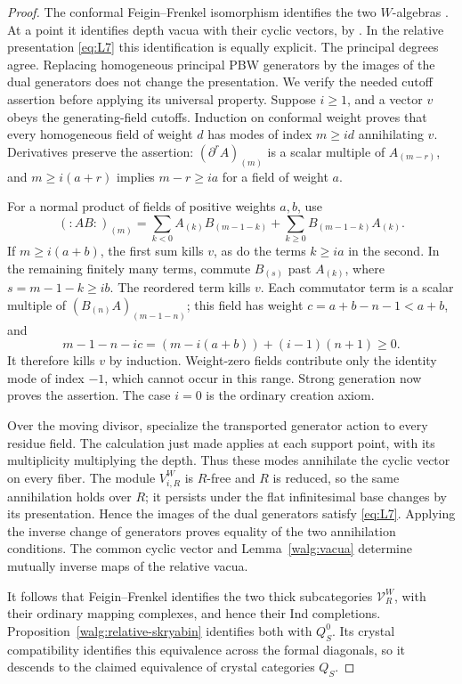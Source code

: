 \documentclass[11pt]{article}
\numberwithin{equation}{section}
\theoremstyle{definition}
\theoremstyle{remark}
\begin{document}
\begin{proof}
The conformal Feigin--Frenkel isomorphism identifies the two
\(W\)-algebras \cite{FeiginFrenkel}.  At a point it identifies depth
vacua with their cyclic vectors, by \cite[Lemma~7.3.3]{RaskinW}.  In the relative
presentation \eqref{eq:L7} this identification is equally explicit.
The principal degrees agree.  Replacing homogeneous principal PBW
generators by the images of the dual generators does not change the
presentation.  We verify the needed cutoff assertion before applying
its universal property.  Suppose \(i\geq1\), and a vector \(v\) obeys
the generating-field cutoffs.  Induction on conformal weight proves
that every homogeneous field of weight \(d\) has modes of index
\(m\geq id\) annihilating \(v\).  Derivatives preserve the assertion:
\((\partial^r A)_{(m)}\) is a scalar multiple of \(A_{(m-r)}\),
and \(m\geq i(a+r)\) implies \(m-r\geq ia\) for a field of
weight \(a\).

For a normal product of fields of positive weights \(a,b\), use
\[
 (:AB:)_{(m)}=
 \sum_{k<0} A_{(k)}B_{(m-1-k)}+
 \sum_{k\geq0}B_{(m-1-k)}A_{(k)}.
\]
If \(m\geq i(a+b)\), the first sum kills \(v\), as do the terms
\(k\geq ia\) in the second.  In the remaining finitely many terms,
commute \(B_{(s)}\) past \(A_{(k)}\), where \(s=m-1-k\geq ib\).
The reordered term kills \(v\).  Each commutator term is a scalar
multiple of \((B_{(n)}A)_{(m-1-n)}\); this field has weight
\(c=a+b-n-1<a+b\), and
\[
 m-1-n-ic=(m-i(a+b))+(i-1)(n+1)\geq0.
\]
It therefore kills \(v\) by induction.  Weight-zero fields contribute
only the identity mode of index \(-1\), which cannot occur in this
range.  Strong generation now proves the assertion.  The case
\(i=0\) is the ordinary creation axiom.

Over the moving divisor, specialize the transported generator action
to every residue field.  The calculation just made applies at each
support point, with its multiplicity multiplying the depth.  Thus
these modes annihilate the cyclic vector on every fiber.  The module
\(V_{i,R}^W\) is \(R\)-free and \(R\) is reduced, so the same
annihilation holds over \(R\); it persists under the flat
infinitesimal base changes by its presentation.  Hence the images of
the dual generators satisfy \eqref{eq:L7}.  Applying the inverse change of
generators proves equality of the two annihilation conditions.
The common cyclic vector and Lemma~\ref{walg:vacua} determine mutually
inverse maps of the relative vacua.

It follows that Feigin--Frenkel identifies the two thick subcategories
\(\mathcal V_R^W\), with their ordinary mapping complexes, and hence
their Ind completions.  Proposition~\ref{walg:relative-skryabin}
identifies both with \(Q_S^0\).  Its crystal compatibility identifies
this equivalence across the formal diagonals, so it descends to the
claimed equivalence of crystal categories \(Q_S\).


\end{proof}
\end{document}

